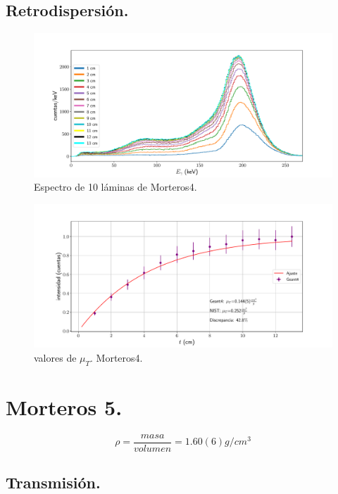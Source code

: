  
 \subsection{Retrodispersión.}
 
 \begin{figure}[H]
 	\centering
 	\includegraphics[width=1.0\linewidth]{Kap4/espectro_m4.pdf}
 	\caption{Espectro de 10 láminas de Morteros4.}
 	\label{fig:espectrom4}
 \end{figure}
 
 \begin{figure}[H]
 	\centering
 	\includegraphics[width=1.0\linewidth]{Kap4/mu_T-m4.pdf}
 	\caption{valores de $\mu_T$. Morteros4.}
 	\label{fig:mut-m4}
 \end{figure}
 
 
 
 
 \section{Morteros 5.}
 
 
 \begin{equation} \label{densidad-mor5}
 \rho=\frac{masa}{volumen}=1.60(6) g/cm^3
 \end{equation}
 
 
 \subsection{Transmisión.}
 
